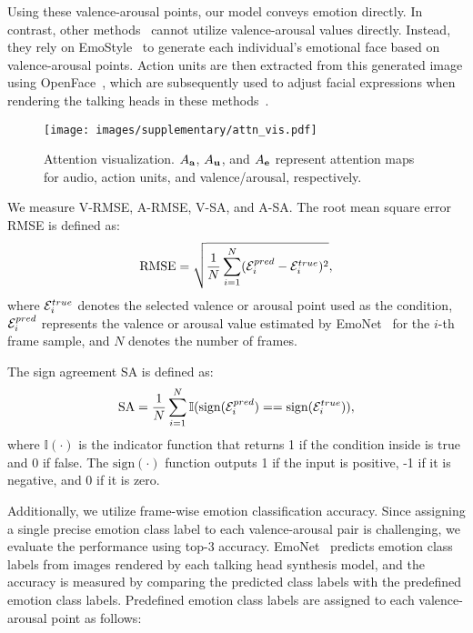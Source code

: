 Using these valence-arousal points, our model conveys emotion directly. In contrast, other methods~\cite{li2023efficient,cho2024gaussiantalker,li2024talkinggaussian} cannot utilize valence-arousal values directly. Instead, they rely on EmoStyle~\cite{azari2024emostyle} to generate each individual's emotional face based on valence-arousal points. Action units are then extracted from this generated image using OpenFace~\cite{Baltrusaitis2018openface}, which are subsequently used to adjust facial expressions when rendering the talking heads in these methods~\cite{li2023efficient,cho2024gaussiantalker,li2024talkinggaussian}.

\begin{figure}[t]
    \centering
    \texttt{[image: images/supplementary/attn\_vis.pdf]}
    \caption{Attention visualization. $A_{\mathbf{a}}$, $A_{\mathbf{u}}$, and $A_{\mathbf{e}}$ represent attention maps for audio, action units, and valence/arousal, respectively.}
    \label{fig:attn vis}
\end{figure}

We measure V-RMSE, A-RMSE, V-SA, and A-SA. The root mean square error RMSE is defined as: 
\begin{eqnarray}
    \text{RMSE} = \sqrt{\frac{1}{N}\sum^N_{i=1}(\mathcal{E}^{pred}_i-\mathcal{E}^{true}_i)^2},
\end{eqnarray}
where $\mathcal{E}^{true}_i$ denotes the selected valence or arousal point used as the condition, $\mathcal{E}^{pred}_i$ represents the valence or arousal value estimated by EmoNet~\cite{toisoul2021estimation} for the $i$-th frame sample, and $N$ denotes the number of frames.

The sign agreement SA is defined as: 
\begin{eqnarray}
    \text{SA} = \frac{1}{N}\sum^N_{i=1}\mathbb{I}(\text{sign}(\mathcal{E}^{pred}_i)==\text{sign}(\mathcal{E}^{true}_i)),
\end{eqnarray}
where $\mathbb{I}(\cdot)$ is the indicator function that returns 1 if the condition inside is true and 0 if false. The $\text{sign}(\cdot)$ function outputs 1 if the input is positive, -1 if it is negative, and 0 if it is zero.

Additionally, we utilize frame-wise emotion classification accuracy. Since assigning a single precise emotion class label to each valence-arousal pair is challenging, we evaluate the performance using top-3 accuracy. EmoNet~\cite{toisoul2021estimation} predicts emotion class labels from images rendered by each talking head synthesis model, and the accuracy is measured by comparing the predicted class labels with the predefined emotion class labels. Predefined emotion class labels are assigned to each valence-arousal point as follows:

